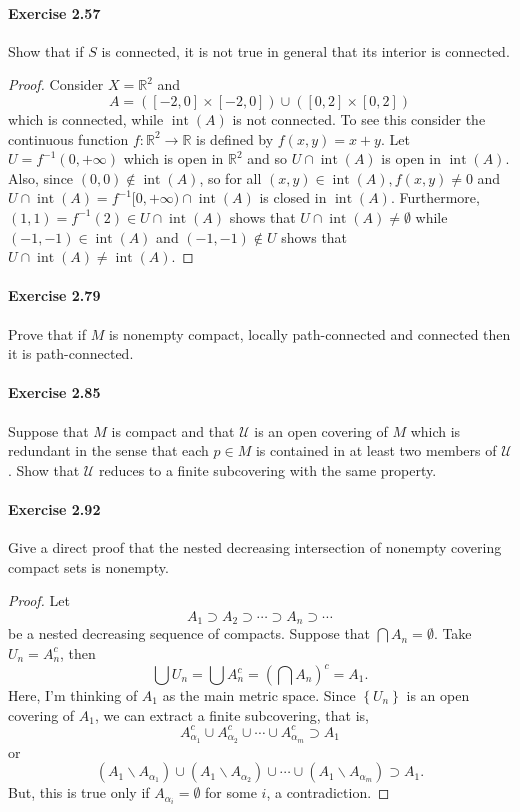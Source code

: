 \documentclass{article}
\begin{document}
\paragraph{Exercise 2.57} Show that if $S$ is connected, it is not true in general that its interior is connected.
\begin{proof}
    Consider $X=\mathbb{R}^2$ and
$$
A=([-2,0] \times[-2,0]) \cup([0,2] \times[0,2])
$$
which is connected, while $\operatorname{int}(A)$ is not connected.
To see this consider the continuous function $f: \mathbb{R}^2 \rightarrow \mathbb{R}$ is defined by $f(x, y)=x+y$. Let $U=f^{-1}(0,+\infty)$ which is open in $\mathbb{R}^2$ and so $U \cap \operatorname{int}(A)$ is open in $\operatorname{int}(A)$. Also, since $(0,0) \notin \operatorname{int}(A)$, so for all $(x, y) \in \operatorname{int}(A), f(x, y) \neq 0$ and $U \cap \operatorname{int}(A)=f^{-1}[0,+\infty) \cap \operatorname{int}(A)$ is closed in $\operatorname{int}(A)$. Furthermore, $(1,1)=f^{-1}(2) \in U \cap \operatorname{int}(A)$ shows that $U \cap \operatorname{int}(A) \neq \emptyset$ while $(-1,-1) \in \operatorname{int}(A)$ and $(-1,-1) \notin U$ shows that $U \cap \operatorname{int}(A) \neq \operatorname{int}(A)$.
\end{proof}



\paragraph{Exercise 2.79} Prove that if $M$ is nonempty compact, locally path-connected and connected then it is path-connected.


\paragraph{Exercise 2.85} Suppose that $M$ is compact and that $\mathcal{U}$ is an open covering of $M$ which is redundant in the sense that each $p \in M$ is contained in at least two members of $\mathcal{U}$. Show that $\mathcal{U}$ reduces to a finite subcovering with the same property.


\paragraph{Exercise 2.92} Give a direct proof that the nested decreasing intersection of nonempty covering compact sets is nonempty.
\begin{proof}
    Let
$$
A_1 \supset A_2 \supset \cdots \supset A_n \supset \cdots
$$
be a nested decreasing sequence of compacts. Suppose that $\bigcap A_n=\emptyset$. Take $U_n=A_n^c$, then
$$
\bigcup U_n=\bigcup A_n^c=\left(\bigcap A_n\right)^c=A_1 .
$$
Here, I'm thinking of $A_1$ as the main metric space. Since $\left\{U_n\right\}$ is an open covering of $A_1$, we can extract a finite subcovering, that is,
$$
A_{\alpha_1}^c \cup A_{\alpha_2}^c \cup \cdots \cup A_{\alpha_m}^c \supset A_1
$$
or
$$
\left(A_1 \backslash A_{\alpha_1}\right) \cup\left(A_1 \backslash A_{\alpha_2}\right) \cup \cdots \cup\left(A_1 \backslash A_{\alpha_m}\right) \supset A_1 .
$$
But, this is true only if $A_{\alpha_i}=\emptyset$ for some $i$, a contradiction.
\end{proof}
\end{document}
